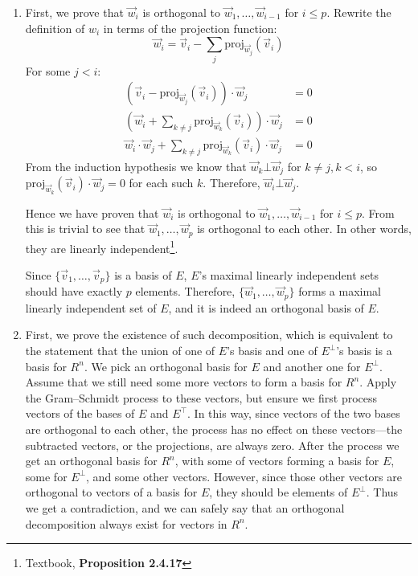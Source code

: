 \documentclass{article}
\begin{document}
\maketitle

\begin{enumerate}[1.]
\item
First, we prove that $\vec{w}_i$ is orthogonal to $\vec{w}_1, \hdots, 
\vec{w}_{i-1}$ for $i \leq p$. Rewrite the definition of $w_i$ in terms of
the projection function:
\newcommand \ProjW[1]{\mathrm{proj}_{\vec{w}_{#1}}(\vec{v}_i)}
$$\vec{w}_i = \vec{v}_i - \sum_j\ProjW{j}$$
For some $j < i$:
$$
\begin{aligned}
(\vec{v}_i - \ProjW{j}) \cdot \vec{w}_j &= 0 \\
(\vec{w}_i + \sum_{k \neq j}\ProjW{k}) \cdot \vec{w}_j &= 0 \\
\vec{w}_i \cdot \vec{w}_j + \sum_{k \neq j} \ProjW{k} \cdot \vec{w}_j &= 0
\end{aligned}
$$
From the induction hypothesis we know that $\vec{w}_k \bot \vec{w}_j$ for
$k \neq j, k < i$, so $\ProjW{k} \cdot \vec{w}_j = 0$ for each such $k$.
Therefore, $\vec{w}_i \bot \vec{w}_j$.

Hence we have proven that $\vec{w}_i$ is orthogonal to $\vec{w}_1, \hdots,
\vec{w}_{i-1}$ for $i \leq p$. From this is trivial to see that $\vec{w}_1,
\hdots, \vec{w}_p$ is orthogonal to each other. In other words, they are
linearly independent\footnote{Textbook, \textbf{Proposition 2.4.17}}.

Since $\{\vec{v}_1, \hdots, \vec{v}_p\}$ is a basis of $E$, $E$'s maximal
linearly independent sets should have exactly $p$ elements. Therefore,
$\{\vec{w}_1, \hdots, \vec{w}_p\}$ forms a maximal linearly independent set of
$E$, and it is indeed an orthogonal basis of $E$. \rQED

\item
First, we prove the existence of such decomposition, which is equivalent to the statement that the union of one of  $E$'s basis and one of $E^{\bot}$'s basis is a basis for $R^n$. We pick an orthogonal basis for $E$ and another one for $E^{\bot}$. Assume that we still need some more vectors to form a basis for $R^n$. Apply the Gram--Schmidt process to these vectors, but ensure we first process vectors of the bases of $E$ and $E^{\top}$. In this way, since vectors of the two bases are orthogonal to each other, the process has no effect on these vectors---the subtracted vectors, or the projections, are always zero. After the process we get an orthogonal basis for $R^n$, with some of vectors forming a basis for $E$, some for $E^{\bot}$, and some other vectors. However, since those other vectors are orthogonal to vectors of a basis for $E$, they should be elements of $E^{\bot}$. Thus we get a contradiction, and we can safely say that an orthogonal decomposition always exist for vectors in $R^n$.


\end{enumerate}
\end{document}
